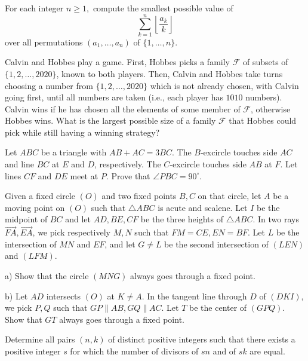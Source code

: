 \documentclass[11pt]{scrartcl}
\begin{document}
\begin{problem}[161342796381450]
For each integer $n\ge 1,$ compute the smallest possible value of\[\sum_{k=1}^{n}\left\lfloor\frac{a_k}{k}\right\rfloor\]over all permutations $(a_1,\dots,a_n)$ of $\{1,\dots,n\}.$
\end{problem}
\begin{problem}[8608387455131778331]
  Calvin and Hobbes play a game.
  First, Hobbes picks a family $\mathcal F$ of subsets
  of $\{1, 2, \dots, 2020\}$, known to both players.
  Then, Calvin and Hobbes take turns choosing a number
  from $\{1, 2, \dots, 2020\}$
  which is not already chosen, with Calvin going first,
  until all numbers are taken (i.e., each player has $1010$ numbers).
  Calvin wins if he has chosen all the elements
  of some member of $\mathcal F$, otherwise Hobbes wins.
  What is the largest possible size of a family $\mathcal F$ that Hobbes
  could pick while still having a winning strategy?
\end{problem}
\begin{problem}[760426813975831]
Let $ABC$ be a triangle with $AB+AC=3BC$. The $B$-excircle touches side $AC$ and line $BC$ at $E$ and $D$, respectively. The $C$-excircle touches side $AB$ at $F$. Let lines $CF$ and $DE$ meet at $P$. Prove that $\angle PBC = 90^{\circ}$.
\end{problem}
\begin{problem}[5990443173263547430]
	Given a fixed circle $(O)$ and two fixed points $B, C$ on that circle, let $A$ be a moving point on $(O)$ such that $\triangle ABC$ is acute and scalene. Let $I$ be the midpoint of $BC$ and let $AD, BE, CF$ be the three heights of $\triangle ABC$. In two rays $\overrightarrow{FA}, \overrightarrow{EA}$, we pick respectively $M,N$ such that $FM = CE, EN = BF$. Let $L$ be the intersection of $MN$ and $EF$, and let $G \neq L$ be the second intersection of $(LEN)$ and $(LFM)$.

a) Show that the circle $(MNG)$ always goes through a fixed point.

b) Let $AD$ intersects $(O)$ at $K \neq A$. In the tangent line through $D$ of $(DKI)$, we pick $P,Q$ such that $GP \parallel AB, GQ \parallel AC$. Let $T$ be the center of $(GPQ)$. Show that $GT$ always goes through a fixed point.
\end{problem}
\begin{problem}[569685816807741]
Determine all pairs $(n, k)$ of distinct positive integers such that there exists a positive integer $s$ for which the number of divisors of $sn$ and of $sk$ are equal.
\end{problem}
\end{document}
